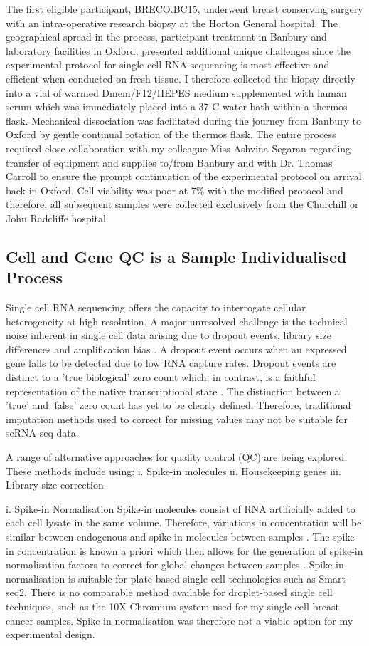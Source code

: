 The first eligible participant, BRECO.BC15, underwent breast conserving surgery with an intra-operative research biopsy at the Horton General hospital. The geographical spread in the process, participant treatment in Banbury and laboratory facilities in Oxford, presented additional unique challenges since the experimental protocol for single cell RNA sequencing is most effective and efficient when conducted on fresh tissue. I therefore collected the biopsy directly into a vial of warmed Dmem/F12/HEPES medium supplemented with human serum which was immediately placed into a 37 \textdegree{}C water bath within a thermos flask. Mechanical dissociation was facilitated during the journey from Banbury to Oxford by gentle continual rotation of the thermos flask. The entire process required close collaboration with my colleague Miss Ashvina Segaran regarding transfer of equipment and supplies to/from Banbury and with Dr. Thomas Carroll to ensure the prompt continuation of the experimental protocol on arrival back in Oxford. Cell viability was poor at 7\% with the modified protocol and therefore, all subsequent samples were collected exclusively from the Churchill or John Radcliffe hospital.

\subsection{Cell and Gene QC is a Sample Individualised Process}
Single cell RNA sequencing offers the capacity to interrogate cellular heterogeneity at high resolution. A major unresolved challenge is the technical noise inherent in single cell data arising due to dropout events, library size differences and amplification bias \cite{Eraslan2019}. A dropout event occurs when an expressed gene fails to be detected due to low RNA capture rates. Dropout events are distinct to a 'true biological' zero count which, in contrast, is a faithful representation of the native transcriptional state \cite{Eraslan2019}. The distinction between a 'true' and 'false' zero count has yet to be clearly defined. Therefore, traditional imputation methods used to correct for missing values may not be suitable for scRNA-seq data.

A range of alternative approaches for quality control (QC) are being explored. These methods include using:
i. Spike-in molecules
ii. Housekeeping genes 
iii. Library size correction

i. Spike-in Normalisation
Spike-in molecules consist of RNA artificially added to each cell lysate in the same volume. Therefore, variations in concentration will be similar between endogenous and spike-in molecules between samples \cite{Katayama2013}. The spike-in concentration is known a priori which then allows for the generation of spike-in normalisation factors to correct for global changes between samples \cite{Katayama2013}. Spike-in normalisation is suitable for plate-based single cell technologies such as Smart-seq2. There is no comparable method available for droplet-based single cell techniques, such as the 10X Chromium system used for my single cell breast cancer samples. Spike-in normalisation was therefore not a viable option for my experimental design.

